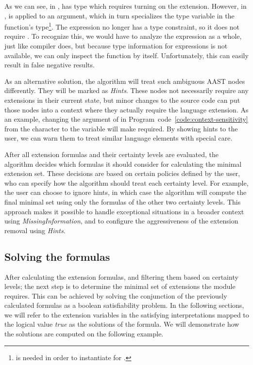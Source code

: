 \documentclass[main.tex]{subfiles}
\begin{document}
	\noindent
	As we can see, in ,  has type which requires turning on the extension. However, in ,  is applied to an argument, which in turn specializes the type variable in the function's type\footnote{ is needed in order to instantiate  for \ilcode{[Char]}.}. The expression  no longer has a type constraint, so it does not require . To recognize this, we would have to analyze the expression as a whole, just like compiler does, but because type information for expressions is not available, we can only inspect the function by itself. Unfortunately, this can easily result in false negative results.
	
	As an alternative solution, the algorithm will treat such ambiguous AAST nodes differently. They will be marked as \emph{Hints}. These nodes not necessarily require any extensions in their current state, but minor changes to the source code can put those nodes into a context where they actually require the language extension. As an example, changing the argument of  in Program~code~\ref{code:context-sensitivity} from the character  to the variable  will make  required. By showing hints to the user, we can warn them to treat similar language elements with special care.
	
	After all extension formulas and their certainty levels are evaluated, the algorithm decides which formulas it should consider for calculating the minimal extension set. These decisions are based on certain policies defined by the user, who can specify how the algorithm should treat each certainty level. For example, the user can choose to ignore hints, in which case the algorithm will compute the final minimal set using only the formulas of the other two certainty levels. This approach makes it possible to handle exceptional situations in a broader context using \emph{MissingInformation}, and to configure the aggressiveness of the extension removal using \emph{Hints}.
	
	\subsection{Solving the formulas} \label{sat-solver}
	
	After calculating the extension formulas, and filtering them based on certainty levels; the next step is to determine the minimal set of extensions the module requires. This can be achieved by solving the conjunction of the previously calculated formulas as a boolean satisfiability problem. In the following sections, we will refer to the extension variables in the satisfying interpretations mapped to the logical value \emph{true} as the solutions of the formula. We will demonstrate how the solutions are computed on the following example.
\end{document}
